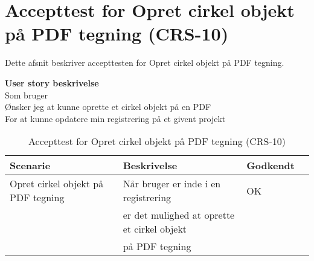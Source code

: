 \section{Accepttest for Opret cirkel objekt på PDF tegning (CRS-10)}
Dette afsnit beskriver accepttesten for Opret cirkel objekt på PDF tegning.

\textbf{User story beskrivelse} \\
Som bruger \\
Ønsker jeg at kunne oprette et cirkel objekt på en PDF \\
For at kunne opdatere min registrering på et givent projekt

\begin{table}[H]
	\centering
	\begin{tabular}{|ll|l|ll|} \hline
		\textbf{Scenarie} &  & \textbf{Beskrivelse}&  \textbf{Godkendt}&  \\ \hline
		Opret cirkel objekt på PDF tegning&  &  Når bruger er inde i en registrering &  OK&  \\
		& & er det mulighed at oprette et cirkel objekt& & \\ 
		& & på PDF tegning& & \\ \hline
	\end{tabular}
	\caption{Accepttest for Opret cirkel objekt på PDF tegning (CRS-10)}
	\label{AcceptCirkel}
\end{table}